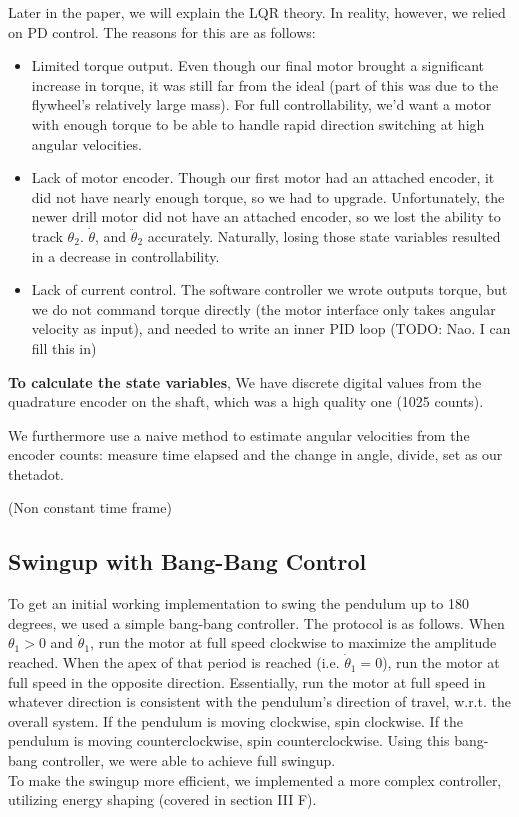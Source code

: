 \documentclass[conference]{IEEEtran}
\begin{document}
Later in the paper, we will explain the LQR theory. In reality, however, we relied on PD
control. The reasons for this are as follows:
\begin{itemize}
    \item Limited torque output. Even though our final motor brought a significant increase in torque, it was still far from the ideal (part of this was due to the flywheel's relatively large mass). For full controllability, we'd want a motor with enough torque to be able to handle rapid direction switching at high angular velocities.
    \item Lack of motor encoder. Though our first motor had an attached encoder, it did not have nearly enough torque, so we had to upgrade. Unfortunately, the newer drill motor did not have an attached encoder, so we lost the ability to track $\theta_2$. $\dot{\theta}$, and $\ddot{\theta}_2$ accurately. Naturally, losing those state variables resulted in a decrease in controllability. 
    \item Lack of current control. The software controller we wrote outputs torque, but
    we do not command torque directly (the motor interface only takes angular velocity as input), and needed to write an inner PID loop  (TODO: Nao. I
    can fill this in)
\end{itemize}


\textbf{To calculate the state variables}, 
We have discrete digital values from the quadrature encoder on the shaft, which
was a high quality one (1025 counts).

We furthermore use a naive method to estimate angular velocities from the
encoder counts: measure time elapsed and the change in angle, divide, set as our
thetadot.

(Non constant time frame)

\subsection{Swingup with Bang-Bang Control}
To get an initial working implementation to swing the pendulum up to 180 degrees, we used a simple bang-bang controller. The protocol is as follows. When $\theta_1 > 0$ and $\dot{\theta}_1$, run the motor at full speed clockwise to maximize the amplitude reached. When the apex of that period is reached (i.e. $\dot{\theta}_1 = 0$), run the motor at full speed in the opposite direction. Essentially, run the motor at full speed in whatever direction is consistent with the pendulum's direction of travel, w.r.t. the overall system. If the pendulum is moving clockwise, spin clockwise. If the pendulum is moving counterclockwise, spin counterclockwise. Using this bang-bang controller, we were able to achieve full swingup.\\ \indent
To make the swingup more efficient, we implemented a more complex controller, utilizing energy shaping (covered in section III F).
\end{document}
